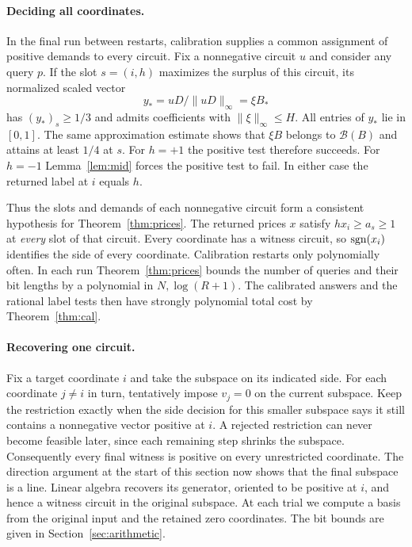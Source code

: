 \paragraph{Deciding all coordinates.}
In the final run between restarts, calibration supplies a common
assignment of positive demands to every circuit.
Fix a nonnegative circuit \(u\) and consider any query \(p\). If the
slot \(s=(i,h)\) maximizes the surplus of this circuit, its normalized
scaled vector
\[
 y_*=uD/\|uD\|_\infty=\xi B_*
\]
has \((y_*)_s\ge1/3\) and admits coefficients with
\(\|\xi\|_\infty\le H\). All entries of \(y_*\) lie in \([0,1]\).
The same approximation estimate shows that \(\xi B\) belongs to
\(\mathcal B(B)\) and attains at least \(1/4\) at \(s\). For \(h=+1\)
the positive test therefore succeeds. For \(h=-1\) Lemma~\ref{lem:mid}
forces the positive test to fail. In either case the returned label at
\(i\) equals \(h\).

Thus the slots and demands of each nonnegative circuit form a
consistent hypothesis for Theorem~\ref{thm:prices}. The returned
prices \(x\) satisfy \(hx_i\ge a_s\ge1\) at \emph{every} slot of that
circuit. Every coordinate has a witness circuit, so \(\operatorname{sgn}(x_i)\)
identifies the side of every coordinate. Calibration restarts only
polynomially often. In each run Theorem~\ref{thm:prices} bounds
the number of queries and their bit lengths by a polynomial in
\(N,\log(R+1)\). The calibrated answers and the rational label tests
then have strongly polynomial total cost by Theorem~\ref{thm:cal}.

\paragraph{Recovering one circuit.}
Fix a target coordinate \(i\) and take the subspace on its indicated
side. For each coordinate \(j\ne i\) in turn, tentatively impose
\(v_j=0\) on the current subspace. Keep the restriction exactly when
the side decision for this smaller subspace says it still contains
a nonnegative vector positive at \(i\). A rejected restriction can
never become feasible later, since each remaining step shrinks the
subspace. Consequently every final witness is positive on every
unrestricted coordinate. The direction argument at the start of this
section now shows that the final subspace is a line. Linear algebra
recovers its generator, oriented to be positive at \(i\), and hence
a witness circuit in the original subspace. At each trial we compute
a basis from the original input and the retained zero coordinates.
The bit bounds are given in Section~\ref{sec:arithmetic}.

